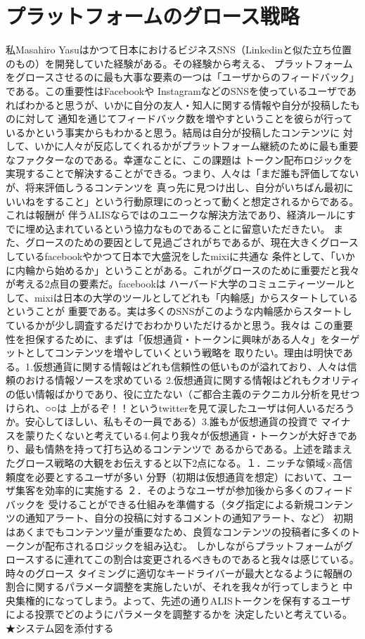 \documentclass{jsarticle}
\begin{document}
\section{プラットフォームのグロース戦略}
私Masahiro Yasuはかつて日本におけるビジネスSNS（Linkedinと似た立ち位置のもの）を開発していた経験がある。その経験から考える、
プラットフォームをグロースさせるのに最も大事な要素の一つは「ユーザからのフィードバック」である。この重要性はFacebookや
InstagramなどのSNSを使っているユーザであればわかると思うが、いかに自分の友人・知人に関する情報や自分が投稿したものに対して
通知を通じてフィードバック数を増やすということを彼らが行っているかという事実からもわかると思う。結局は自分が投稿したコンテンツに
対して、いかに人々が反応してくれるかがプラットフォーム継続のために最も重要なファクターなのである。幸運なことに、この課題は
トークン配布ロジックを実現することで解決することができる。つまり、人々は「まだ誰も評価してないが、将来評価しうるコンテンツを
真っ先に見つけ出し、自分がいちばん最初にいいねをすること」という行動原理にのっとって動くと想定されるからである。これは報酬が
伴うALISならではのユニークな解決方法であり、経済ルールにすでに埋め込まれているという協力なものであることに留意いただきたい。
また、グロースのための要因として見過ごされがちであるが、現在大きくグロースしているfacebookやかつて日本で大盛況をしたmixiに共通な
条件として、「いかに内輪から始めるか」ということがある。これがグロースのために重要だと我々が考える2点目の要素だ。facebookは
ハーバード大学のコミュニティーツールとして、mixiは日本の大学のツールとしてどれも「内輪感」からスタートしているということが
重要である。実は多くのSNSがこのような内輪感からスタートしているかが少し調査するだけでおわかりいただけるかと思う。我々は
この重要性を担保するために、まずは「仮想通貨・トークンに興味がある人々」をターゲットとしてコンテンツを増やしていくという戦略を
取りたい。理由は明快である。1.仮想通貨に関する情報はどれも信頼性の低いものが溢れており、人々は信頼のおける情報ソースを求めている
2.仮想通貨に関する情報はどれもクオリティの低い情報ばかりであり、役に立たない（ご都合主義のテクニカル分析を見せつけられ、○○は
上がるぞ！！というtwitterを見て涙したユーザは何人いるだろうか。安心してほしい、私もその一員である）3.誰もが仮想通貨の投資で
マイナスを蒙りたくないと考えている4.何より我々が仮想通貨・トークンが大好きであり、最も情熱を持って打ち込めるコンテンツで
あるからである。上述を踏まえたグロース戦略の大観をお伝えすると以下2点になる。１．ニッチな領域×高信頼度を必要とするユーザが多い
分野（初期は仮想通貨を想定）において、ユーザ集客を効率的に実施する ２．そのようなユーザが参加後から多くのフィードバックを
受けることができる仕組みを準備する（タグ指定による新規コンテンツの通知アラート、自分の投稿に対するコメントの通知アラート、など）
初期はあくまでもコンテンツ量が重要なため、良質なコンテンツの投稿者に多くのトークンが配布されるロジックを組み込む。
しかしながらプラットフォームがグロースするに連れてこの割合は変更されるべきものであると我々は感じている。時々のグロース
タイミングに適切なキードライバーが最大となるように報酬の割合に関するパラメータ調整を実施したいが、それを我々が行ってしまうと
中央集権的になってしまう。よって、先述の通りALISトークンを保有するユーザによる投票でどのようにパラメータを調整するかを
決定したいと考えている。★システム図を添付する
\end{document}

